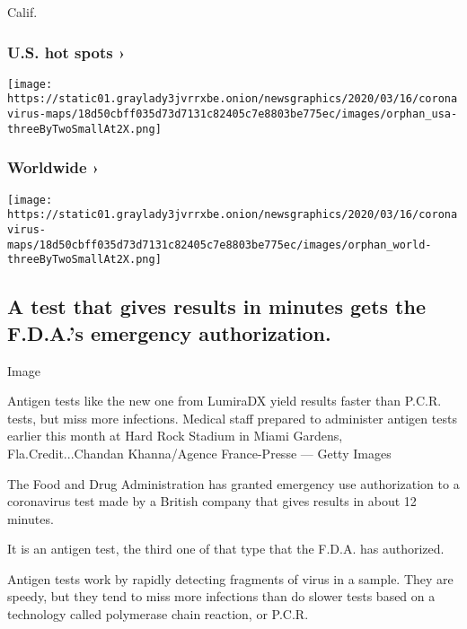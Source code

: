 Calif.

\href{https://www.nytimes3xbfgragh.onion/interactive/2020/us/coronavirus-us-cases.html}{}

\hypertarget{us-hot-spots-}{%
\subsubsection{U.S. hot spots ›}\label{us-hot-spots-}}

\texttt{[image: https://static01.graylady3jvrrxbe.onion/newsgraphics/2020/03/16/coronavirus-maps/18d50cbff035d73d7131c82405c7e8803be775ec/images/orphan\_usa-threeByTwoSmallAt2X.png]}
\href{https://www.nytimes3xbfgragh.onion/interactive/2020/world/coronavirus-maps.html}{}

\hypertarget{worldwide-}{%
\subsubsection{Worldwide ›}\label{worldwide-}}

\texttt{[image: https://static01.graylady3jvrrxbe.onion/newsgraphics/2020/03/16/coronavirus-maps/18d50cbff035d73d7131c82405c7e8803be775ec/images/orphan\_world-threeByTwoSmallAt2X.png]}

\hypertarget{a-test-that-gives-results-in-minutes-gets-the-fdas-emergency-authorization}{%
\subsection{A test that gives results in minutes gets the F.D.A.'s
emergency
authorization.}\label{a-test-that-gives-results-in-minutes-gets-the-fdas-emergency-authorization}}

Image

Antigen tests like the new one from LumiraDX yield results faster than
P.C.R. tests, but miss more infections. Medical staff prepared to
administer antigen tests earlier this month at Hard Rock Stadium in
Miami Gardens, Fla.Credit...Chandan Khanna/Agence France-Presse ---
Getty Images

The Food and Drug Administration has granted emergency use authorization
to a coronavirus test made by a British company that gives results in
about 12 minutes.

It is an antigen test, the third one of that type that the F.D.A. has
authorized.

Antigen tests work by rapidly detecting fragments of virus in a sample.
They are speedy, but they tend to miss more infections than do slower
tests based on a technology called polymerase chain reaction, or P.C.R.

